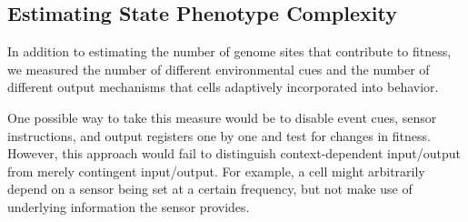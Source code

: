 



\subsection{Estimating State Phenotype Complexity}
\label{sec:estimating-state-interface-complexity;ch:measuring-cna}

In addition to estimating the number of genome sites that contribute to fitness, we measured the number of different environmental cues and the number of different output mechanisms that cells adaptively incorporated into behavior.

One possible way to take this measure would be to disable event cues, sensor instructions, and output registers one by one and test for changes in fitness.
However, this approach would fail to distinguish context-dependent input/output from merely contingent input/output.
For example, a cell might arbitrarily depend on a sensor being set at a certain frequency, but not make use of underlying information the sensor provides.

